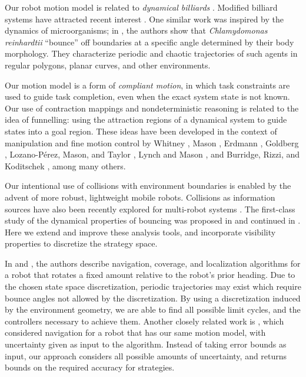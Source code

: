 \documentclass[]{article}
\begin{document}
Our robot motion model is related to
\emph{dynamical billiards} \cite{billiards}. Modified billiard systems have attracted recent interest
\cite{DelMagno2014,pinball,billiards}. One similar work was inspired by the
dynamics of microorganisms; in \cite{microorganism2017}, the authors show that
\textit{Chlamydomonas reinhardtii} ``bounce'' off boundaries at a specific
angle determined by their body morphology. They characterize periodic and
chaotic trajectories of such agents in regular polygons, planar curves, and
other environments.

Our motion model is a
form of \emph{compliant motion}, in which task constraints are used to guide task
completion, even when the exact system state is not known. Our use of
contraction mappings and nondeterministic reasoning is
related to the idea of funnelling: using
the attraction regions of a dynamical system to guide states into a goal region.
These ideas have been developed in the context of manipulation and fine motion control by Whitney
\cite{Whi77}, Mason \cite{Mas85}, Erdmann
\cite{Erd86}, Goldberg \cite{Gol93}, Lozano-P{\'e}rez, Mason, and Taylor
\cite{LozMasTay84}, Lynch and Mason \cite{LynMas95}, and Burridge, Rizzi, and Koditschek
\cite{BurRizKod99}, among many others.

Our intentional use of collisions with
environment boundaries is enabled by the advent of more robust, lightweight mobile
robots. Collisions as information sources have also been
recently explored for multi-robot systems \cite{mayya2018localization}.
The first-class study of the dynamical properties of bouncing was proposed in
\cite{ErLav13} and continued in \cite{NilBecLav17}. Here we extend and improve
these analysis tools, and incorporate visibility properties to
discretize the strategy space.

In \cite{alam2017minimalist} and \cite{alam2018space}, the authors describe
navigation, coverage, and localization algorithms for a robot that rotates a fixed amount 
relative to the robot's prior heading. Due to the chosen state space discretization, 
periodic trajectories may exist which require bounce angles not allowed by the
discretization. By using a discretization induced by the environment geometry,
we are able to find all possible limit cycles, and the controllers necessary to
achieve them.
Another closely related work is \cite{LewOKa13}, which considered
navigation for a robot that has our same motion model, with uncertainty given as input to the
algorithm. Instead of taking error bounds as input, our approach
considers all possible amounts of uncertainty, and returns bounds on the required
accuracy for strategies.
\end{document}
